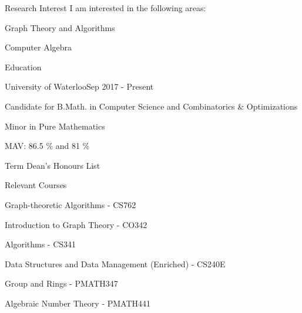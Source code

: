 \documentclass{cv}
\begin{document}
\begin{rSection}{Research Interest}
I am interested in the following areas:
\begin{rSubsectionPure}
	\item Graph Theory and Algorithms
	\item Computer Algebra
\end{rSubsectionPure}
\end{rSection}

\begin{rSection}{Education}
\begin{rSubsection}{University of Waterloo}{Sep 2017 - Present}{}{}
	\item Candidate for B.Math. in Computer Science and Combinatorics \& Optimizations
	\item Minor in Pure Mathematics
	\item MAV: 86.5 \% and 81 \%
	\item Term Dean's Honours List
\end{rSubsection}

\begin{rSubsection}{Relevant Courses}{}{}{}
	\item Graph-theoretic Algorithms - CS762
	\item Introduction to Graph Theory - CO342
	\item Algorithms - CS341
	\item Data Structures and Data Management (Enriched) - CS240E
	\item Group and Rings - PMATH347
	\item Algebraic Number Theory - PMATH441
\end{rSubsection}
\end{rSection}
\end{document}
